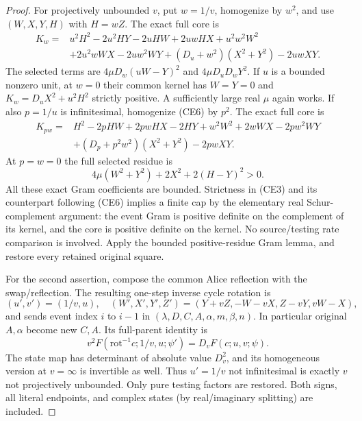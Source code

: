 \begin{proof}
For projectively unbounded $v$, put $w=1/v$, homogenize by $w^2$, and
use $(W,X,Y,H)$ with $H=wZ$. The exact full core is
\begin{align*}
 K_w={}&u^2H^2-2u^2HY-2uHW+2uwHX+u^2w^2W^2\\
 &+2u^2wWX-2uw^2WY+(D_u+w^2)(X^2+Y^2)-2uwXY.
                                                        \tag{CE6}
\end{align*}
The selected terms are $4\mu D_w(uW-Y)^2$ and
$4\mu D_uD_wY^2$. If $u$ is a bounded nonzero unit, at $w=0$ their
common kernel has $W=Y=0$ and $K_w=D_uX^2+u^2H^2$ strictly positive.
A sufficiently large real $\mu$ again works. If also $p=1/u$ is
infinitesimal, homogenize (CE6) by $p^2$. The exact full core is
\begin{align*}
 K_{pw}={}&H^2-2pHW+2pwHX-2HY+w^2W^2+2wWX-2pw^2WY\\
 &+(D_p+p^2w^2)(X^2+Y^2)-2pwXY.              \tag{CE7}
\end{align*}
At $p=w=0$ the full selected residue is
\[
 4\mu(W^2+Y^2)+2X^2+2(H-Y)^2>0.             \tag{CE8}
\]
All these exact Gram coefficients are bounded. Strictness in (CE3) and
its counterpart following (CE6) implies a finite cap by the elementary
real Schur-complement argument: the event Gram is positive definite on
the complement of its kernel, and the core is positive definite on the
kernel. No source/testing rate comparison is involved. Apply the bounded
positive-residue Gram lemma, and restore every retained original square.

For the second assertion, compose the common Alice reflection with
the swap/reflection. The resulting one-step inverse cycle rotation is
\[
 (u',v')=(1/v,u),\quad
 (W',X',Y',Z')=(Y+vZ,-W-vX,Z-vY,vW-X),          \tag{CE9}
\]
and sends event index $i$ to $i-1$ in
$(\lambda,D,C,A,\alpha,m,\beta,n)$. In particular original $A,\alpha$
become new $C,A$. Its full-parent identity is
\[
 v^2F(\mathrm{rot}^{-1}c;1/v,u;\psi')=D_vF(c;u,v;\psi).
                                                        \tag{CE10}
\]
The state map has determinant of absolute value $D_v^2$, and its
homogeneous version at $v=\infty$ is invertible as well. Thus
$u'=1/v$ not infinitesimal is exactly $v$ not projectively unbounded.
Only pure testing factors are restored. Both signs, all literal endpoints,
and complex states (by real/imaginary splitting) are included.
\end{proof}

